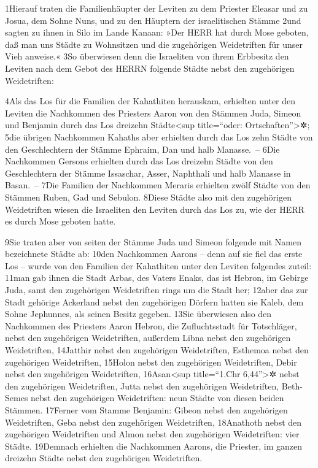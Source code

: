 1Hierauf traten die Familienhäupter der Leviten zu dem Priester Eleasar
und zu Josua, dem Sohne Nuns, und zu den Häuptern der israelitischen
Stämme 2und sagten zu ihnen in Silo im Lande Kanaan: »Der HERR hat durch
Mose geboten, daß man uns Städte zu Wohnsitzen und die zugehörigen
Weidetriften für unser Vieh anweise.« 3So überwiesen denn die Israeliten
von ihrem Erbbesitz den Leviten nach dem Gebot des HERRN folgende Städte
nebst den zugehörigen Weidetriften:

4Als das Los für die Familien der Kahathiten herauskam, erhielten unter
den Leviten die Nachkommen des Priesters Aaron von den Stämmen Juda,
Simeon und Benjamin durch das Los dreizehn Städte\textless sup
title=``oder: Ortschaften''\textgreater✲; 5die übrigen Nachkommen
Kahaths aber erhielten durch das Los zehn Städte von den Geschlechtern
der Stämme Ephraim, Dan und halb Manasse.~-- 6Die Nachkommen Gersons
erhielten durch das Los dreizehn Städte von den Geschlechtern der Stämme
Issaschar, Asser, Naphthali und halb Manasse in Basan.~-- 7Die Familien
der Nachkommen Meraris erhielten zwölf Städte von den Stämmen Ruben, Gad
und Sebulon. 8Diese Städte also mit den zugehörigen Weidetriften wiesen
die Israeliten den Leviten durch das Los zu, wie der HERR es durch Mose
geboten hatte.

9Sie traten aber von seiten der Stämme Juda und Simeon folgende mit
Namen bezeichnete Städte ab: 10den Nachkommen Aarons -- denn auf sie
fiel das erste Los -- wurde von den Familien der Kahathiten unter den
Leviten folgendes zuteil: 11man gab ihnen die Stadt Arbas, des Vaters
Enaks, das ist Hebron, im Gebirge Juda, samt den zugehörigen
Weidetriften rings um die Stadt her; 12aber das zur Stadt gehörige
Ackerland nebst den zugehörigen Dörfern hatten sie Kaleb, dem Sohne
Jephunnes, als seinen Besitz gegeben. 13Sie überwiesen also den
Nachkommen des Priesters Aaron Hebron, die Zufluchtsstadt für
Totschläger, nebst den zugehörigen Weidetriften, außerdem Libna nebst
den zugehörigen Weidetriften, 14Jatthir nebst den zugehörigen
Weidetriften, Esthemoa nebst den zugehörigen Weidetriften, 15Holon nebst
den zugehörigen Weidetriften, Debir nebst den zugehörigen Weidetriften,
16Asan\textless sup title=``1.Chr 6,44''\textgreater✲ nebst den
zugehörigen Weidetriften, Jutta nebst den zugehörigen Weidetriften,
Beth-Semes nebst den zugehörigen Weidetriften: neun Städte von diesen
beiden Stämmen. 17Ferner vom Stamme Benjamin: Gibeon nebst den
zugehörigen Weidetriften, Geba nebst den zugehörigen Weidetriften,
18Anathoth nebst den zugehörigen Weidetriften und Almon nebst den
zugehörigen Weidetriften: vier Städte. 19Demnach erhielten die
Nachkommen Aarons, die Priester, im ganzen dreizehn Städte nebst den
zugehörigen Weidetriften.

